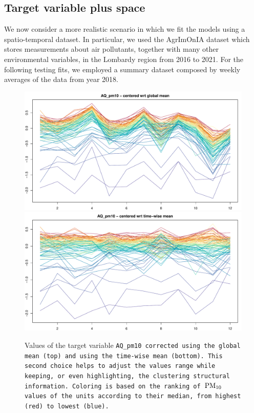 \documentclass[12pt,	%
	a4paper,		%
	twoside,		%
	openright,		%
	titlepage,%
	]{book}
\theoremstyle{definition}
\begin{document}
\subsection{Target variable plus space}
\label{Target variable plus space}
We now consider a more realistic scenario in which we fit the models using a spatio-temporal dataset. In particular, we used the AgrImOnIA \cite{agrimonia} dataset which stores measurements about air pollutants, together with many other environmental variables, in the Lombardy region from 2016 to 2021. For the following testing fits, we employed a summary dataset composed by weekly averages of the data from year 2018. 

\begin{figure}[!ht]
    \centering
    \includegraphics[width=1\linewidth]{Testing/Covariates/corollary images/AQ_pm10centered wrt global mean.pdf}
    \includegraphics[width=1\linewidth]{Testing/Covariates/corollary images/AQ_pm10centered wrt time-wise mean.pdf}
    \caption[Comparison of the two possible mean centering methods on the target variable]{Values of the target variable \tt{AQ\_pm10} corrected using the global mean (top) and using the time-wise mean (bottom). This second choice helps to adjust the values range while keeping, or even highlighting, the clustering structural information. Coloring is based on the ranking of $\text{PM}_{10}$ values of the units according to their median, from highest (red) to lowest (blue).}
    \label{fig:different means conceptions PM10}
\end{figure}
\end{document}
